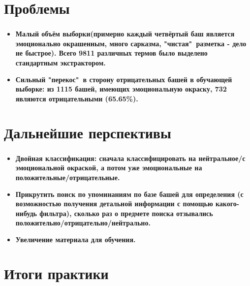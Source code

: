 \documentclass[t]{beamer}
\begin{document}
    
    
	\section{Проблемы}
	
	\begin{frame}
		\frametitle{\insertsection}
		\begin{itemize}
			\item{\textbf{Малый объём выборки(примерно каждый четвёртый баш является эмоционально окрашенным, много сарказма, "чистая"\ разметка - дело не быстрое). Всего 9811 различных термов было выделено стандартным экстрактором.}}
			\item{\textbf{Сильный "перекос"\ в сторону отрицательных башей в обучающей выборке: из 1115 башей, имеющих эмоциональную окраску, 732 являются отрицательными (65.65\%).}}
		\end{itemize}
	\end{frame}

	\section{Дальнейшие перспективы}
	\begin{frame}
		\frametitle{\insertsection}
		\begin{itemize}
			\item
			\textbf{Двойная классификация: сначала классифицировать на нейтральное/с эмоциональной окраской, а потом уже эмоциональные на положительные/отрицательные. }
			\item
			\textbf{Прикрутить поиск по упоминаниям по базе башей для определения (с возможностью получения детальной информации с помощью какого-нибудь фильтра), сколько раз о предмете поиска отзывались положительно/отрицательно/нейтрально.}
			\item
			\textbf{Увеличение материала для обучения.} 
			
		\end{itemize}
		
	\end{frame}
		
	
	\section{Итоги практики}
	
\end{document}
